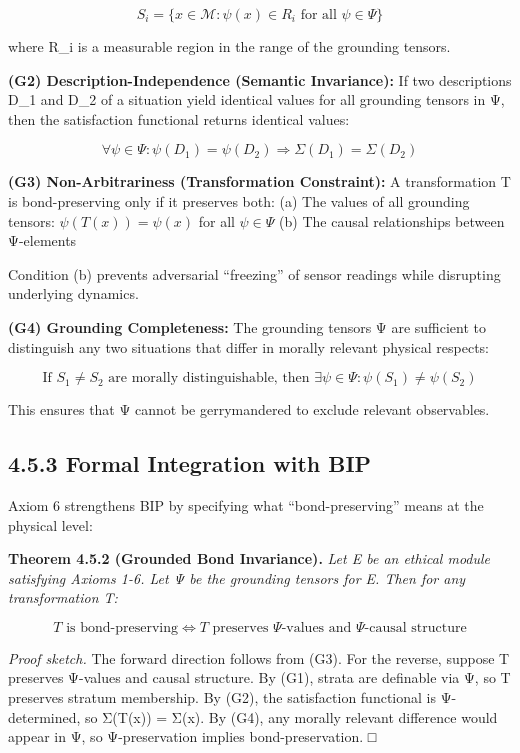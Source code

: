 \documentclass[12pt]{article}
\theoremstyle{plain}
\theoremstyle{definition}
\theoremstyle{remark}
\begin{document}
\[S_{i} = \{ x\mathcal{\in M:}\psi(x) \in R_{i}\text{ for all }\psi \in \Psi\}\]

where R\_i is a measurable region in the range of the grounding tensors.

\textbf{(G2) Description-Independence (Semantic Invariance):} If two
descriptions D\_1 and D\_2 of a situation yield identical values for all
grounding tensors in Ψ, then the satisfaction functional returns
identical values:

\[\forall\psi \in \Psi:\psi\left( D_{1} \right) = \psi\left( D_{2} \right) \Longrightarrow \Sigma\left( D_{1} \right) = \Sigma\left( D_{2} \right)\]

\textbf{(G3) Non-Arbitrariness (Transformation Constraint):} A
transformation T is bond-preserving only if it preserves both: (a) The
values of all grounding tensors: \(\psi\left( T(x) \right) = \psi(x)\)
for all \(\psi \in \Psi\) (b) The causal relationships between
Ψ-elements

Condition (b) prevents adversarial ``freezing'' of sensor readings while
disrupting underlying dynamics.

\textbf{(G4) Grounding Completeness:} The grounding tensors Ψ are
sufficient to distinguish any two situations that differ in morally
relevant physical respects:

\[\text{If }S_{1} \neq S_{2}\text{ are morally distinguishable, then }\exists\psi \in \Psi:\psi\left( S_{1} \right) \neq \psi\left( S_{2} \right)\]

This ensures that Ψ cannot be gerrymandered to exclude relevant
observables.

\subsection{4.5.3 Formal Integration with
BIP}\label{formal-integration-with-bip}

Axiom 6 strengthens BIP by specifying what ``bond-preserving'' means at
the physical level:

\textbf{Theorem 4.5.2 (Grounded Bond Invariance).} \emph{Let E be an
ethical module satisfying Axioms 1-6. Let Ψ be the grounding tensors for
E. Then for any transformation T:}

\[T\text{ is bond-preserving} \Leftrightarrow T\text{ preserves }\Psi\text{-values and }\Psi\text{-causal structure}\]

\emph{Proof sketch.} The forward direction follows from (G3). For the
reverse, suppose T preserves Ψ-values and causal structure. By (G1),
strata are definable via Ψ, so T preserves stratum membership. By (G2),
the satisfaction functional is Ψ-determined, so Σ(T(x)) = Σ(x). By (G4),
any morally relevant difference would appear in Ψ, so Ψ-preservation
implies bond-preservation. □
\end{document}

